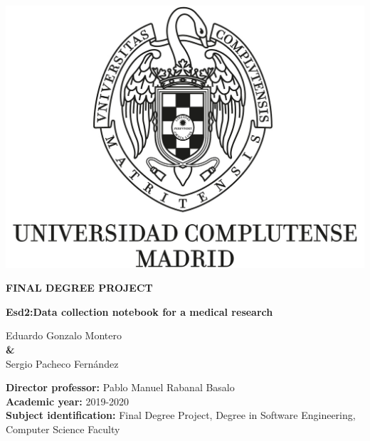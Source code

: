 \documentclass{report}
\begin{document}
\begin{titlepage}
        \clearpage
        
        \pagestyle{empty}
 
        \centering
        {\includegraphics[width=1\textwidth]{images/logo_UCM}}
    
        \vspace{1cm}
        
        {\huge\textbf{FINAL DEGREE PROJECT \\ }  }

        \vspace{0.5cm}
        
        {\huge\textbf{Esd2:Data collection notebook for a medical research}}
        
        \vspace{1.6cm}
    
        {\Large Eduardo Gonzalo Montero \\}
        \vspace{0.5cm}
        {\textbf \& \\}
        \vspace{0.5cm}
        {\Large Sergio Pacheco Fernández \\}
        
        \vspace{1.6cm}
        
        \raggedright
        {\Large \textbf{Director professor:} Pablo Manuel Rabanal Basalo \\}
        \vspace{0.1cm}
        {\Large\textbf {Academic year:} 2019-2020 \\}
        \vspace{0.1cm}
        {\Large\textbf {Subject identification: }Final Degree Project, Degree in Software Engineering, Computer Science Faculty\\}
    
        \clearpage
     \end{titlepage}
\end{document}
